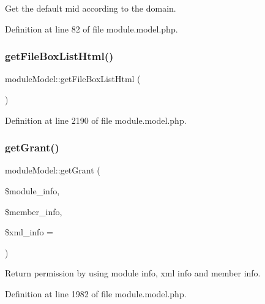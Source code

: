 Get the default mid according to the domain. 



Definition at line 82 of file module.\+model.\+php.

\mbox{\label{classmoduleModel_acf3405bfe791d8bf7d8e7886b9481923}} 
\subsubsection{\texorpdfstring{get\+File\+Box\+List\+Html()}{getFileBoxListHtml()}}
{\footnotesize\ttfamily module\+Model\+::get\+File\+Box\+List\+Html (\begin{DoxyParamCaption}{ }\end{DoxyParamCaption})}



Definition at line 2190 of file module.\+model.\+php.

\mbox{\label{classmoduleModel_a7ed08b703723a21e4d81b4aa89947264}} 
\subsubsection{\texorpdfstring{get\+Grant()}{getGrant()}}
{\footnotesize\ttfamily module\+Model\+::get\+Grant (\begin{DoxyParamCaption}\item[{}]{\$module\+\_\+info,  }\item[{}]{\$member\+\_\+info,  }\item[{}]{\$xml\+\_\+info = {\ttfamily \textquotesingle{}\textquotesingle{}} }\end{DoxyParamCaption})}



Return permission by using module info, xml info and member info. 



Definition at line 1982 of file module.\+model.\+php.

\mbox{\label{classmoduleModel_a4ea7187b04b26a98fe6d7fd138817b16}} 
